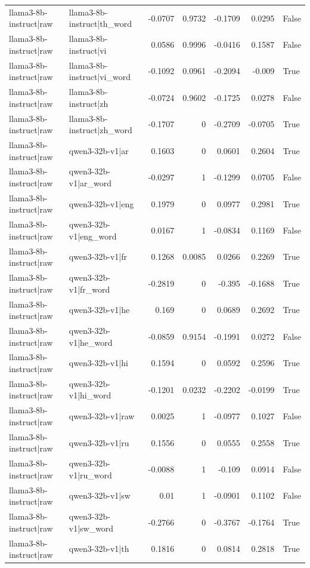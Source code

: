\begin{table}
\begin{tabular}{l l r r r r l}
llama3-8b-instruct|raw & llama3-8b-instruct|th_word & -0.0707 & 0.9732 & -0.1709 & 0.0295 & False \\
llama3-8b-instruct|raw & llama3-8b-instruct|vi & 0.0586 & 0.9996 & -0.0416 & 0.1587 & False \\
llama3-8b-instruct|raw & llama3-8b-instruct|vi_word & -0.1092 & 0.0961 & -0.2094 & -0.009 & True \\
llama3-8b-instruct|raw & llama3-8b-instruct|zh & -0.0724 & 0.9602 & -0.1725 & 0.0278 & False \\
llama3-8b-instruct|raw & llama3-8b-instruct|zh_word & -0.1707 & 0 & -0.2709 & -0.0705 & True \\
llama3-8b-instruct|raw & qwen3-32b-v1|ar & 0.1603 & 0 & 0.0601 & 0.2604 & True \\
llama3-8b-instruct|raw & qwen3-32b-v1|ar_word & -0.0297 & 1 & -0.1299 & 0.0705 & False \\
llama3-8b-instruct|raw & qwen3-32b-v1|eng & 0.1979 & 0 & 0.0977 & 0.2981 & True \\
llama3-8b-instruct|raw & qwen3-32b-v1|eng_word & 0.0167 & 1 & -0.0834 & 0.1169 & False \\
llama3-8b-instruct|raw & qwen3-32b-v1|fr & 0.1268 & 0.0085 & 0.0266 & 0.2269 & True \\
llama3-8b-instruct|raw & qwen3-32b-v1|fr_word & -0.2819 & 0 & -0.395 & -0.1688 & True \\
llama3-8b-instruct|raw & qwen3-32b-v1|he & 0.169 & 0 & 0.0689 & 0.2692 & True \\
llama3-8b-instruct|raw & qwen3-32b-v1|he_word & -0.0859 & 0.9154 & -0.1991 & 0.0272 & False \\
llama3-8b-instruct|raw & qwen3-32b-v1|hi & 0.1594 & 0 & 0.0592 & 0.2596 & True \\
llama3-8b-instruct|raw & qwen3-32b-v1|hi_word & -0.1201 & 0.0232 & -0.2202 & -0.0199 & True \\
llama3-8b-instruct|raw & qwen3-32b-v1|raw & 0.0025 & 1 & -0.0977 & 0.1027 & False \\
llama3-8b-instruct|raw & qwen3-32b-v1|ru & 0.1556 & 0 & 0.0555 & 0.2558 & True \\
llama3-8b-instruct|raw & qwen3-32b-v1|ru_word & -0.0088 & 1 & -0.109 & 0.0914 & False \\
llama3-8b-instruct|raw & qwen3-32b-v1|sw & 0.01 & 1 & -0.0901 & 0.1102 & False \\
llama3-8b-instruct|raw & qwen3-32b-v1|sw_word & -0.2766 & 0 & -0.3767 & -0.1764 & True \\
llama3-8b-instruct|raw & qwen3-32b-v1|th & 0.1816 & 0 & 0.0814 & 0.2818 & True \\

\end{tabular}
\end{table}
